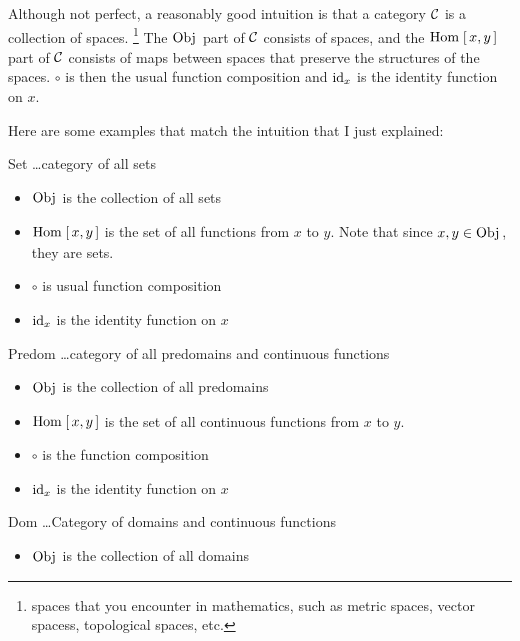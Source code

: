 \begin{enumcirc}
	\item
	Although not perfect, a reasonably good intuition is that a category $\mathcal{C}$ is a
	collection of spaces.
	\footnote{spaces that you encounter in mathematics, such
		as metric spaces, vector spacess, topological spaces, etc.}
	The $\textrm{Obj}_{\textrm{\tiny \ensuremath{{}_{}}}}$ part of $\mathcal{C}$ consists of spaces, and the $\textrm{Hom}_{\textrm{\tiny \ensuremath{{}_{}}}}\left[ \, x, y \, \right]$ part of
	$\mathcal{C}$ consists of maps between spaces that preserve the structures of the
	spaces.
	$\circ$ is then the usual function composition and $\textrm{id}_x$ is the identity function on $x$.
	\item
	Here are some examples that match the intuition that I just explained:
	\begin{enumrm}
		\item
		Set \dots category of all sets
		\begin{itemize}
			\item
			      $\textrm{Obj}_{\textrm{\tiny \ensuremath{{}_{}}}}$ is the collection of all sets
			\item
			      $\textrm{Hom}_{\textrm{\tiny \ensuremath{{}_{}}}}\left[ \, x, y \, \right]$ is the set of all functions from $x$ to $y$.
			      Note that since $x, y \in \textrm{Obj}_{\textrm{\tiny \ensuremath{{}_{}}}}$, they are sets.
			\item
			      $\circ$ is usual function composition
			\item
			      $\textrm{id}_x$ is the identity function on $x$
		\end{itemize}
		\item
		Predom \dots category of all predomains and continuous functions
		\begin{itemize}
			\item
			      $\textrm{Obj}_{\textrm{\tiny \ensuremath{{}_{}}}}$ is the collection of all predomains
			\item
			      $\textrm{Hom}_{\textrm{\tiny \ensuremath{{}_{}}}}\left[ \, x, y \, \right]$ is the set of all continuous functions from $x$ to $y$.
			\item
			      $\circ$ is the function composition
			\item
			      $\textrm{id}_x$ is the identity function on $x$
		\end{itemize}
		\item
		Dom \dots Category of domains and continuous functions
		\begin{itemize}
			\item
			      $\textrm{Obj}_{\textrm{\tiny \ensuremath{{}_{}}}}$ is the collection of all domains

\end{itemize}
\end{enumrm}
\end{enumcirc}
